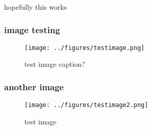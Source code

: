 

hopefully this works

\hypertarget{image-testing}{%
\subsubsection{image testing}\label{image-testing}}

\begin{figure}
\centering
\texttt{[image: ../figures/testimage.png]}
\caption{test image caption?}
\end{figure}

\hypertarget{another-image}{%
\subsubsection{another image}\label{another-image}}

\begin{figure}
\centering
\texttt{[image: ../figures/testimage2.png]}
\caption{test image}
\end{figure}
